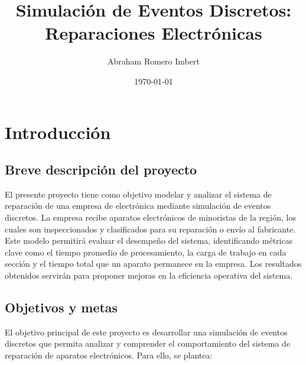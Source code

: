 \documentclass[a4paper,12pt]{article}
\title{Simulación de Eventos Discretos: Reparaciones Electrónicas}
\author{Abraham Romero Imbert}
\date{\today}
\begin{document}
\maketitle

\section{Introducción}

\subsection{Breve descripción del proyecto}

El presente proyecto tiene como objetivo modelar y analizar el sistema de reparación de 
una empresa de electrónica mediante simulación de eventos discretos. La empresa recibe 
aparatos electrónicos de minoristas de la región, los cuales son inspeccionados y clasificados 
para su reparación o envío al fabricante. Este modelo permitirá evaluar el desempeño del sistema, 
identificando métricas clave como el tiempo promedio de procesamiento, la carga de trabajo en 
cada sección y el tiempo total que un aparato permanece en la empresa. Los resultados obtenidos 
servirán para proponer mejoras en la eficiencia operativa del sistema.

\subsection{Objetivos y metas}
El objetivo principal de este proyecto es desarrollar una simulación de eventos discretos que permita analizar y comprender el comportamiento del sistema de reparación de aparatos electrónicos. Para ello, se plantea:
\end{document}
